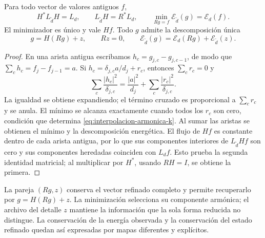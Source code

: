 \begin{theorem}
\label{thm:energia-schur-refinamiento}
Para todo vector de valores antiguos \(f\),
\begin{equation}
 H^*L_{\widetilde d}H=L_d,
 \qquad L_{\widetilde d}H=R^*L_d,
 \qquad
 \min_{Rg=f}\mathcal E_{\widetilde d}(g)=\mathcal E_d(f).
 \label{eq:isometria-energia-k}
\end{equation}
El minimizador es único y vale \(Hf\). Todo \(g\) admite la
descomposición única
\begin{equation}
 g=H(Rg)+z,\qquad Rz=0,
 \qquad
 \mathcal E_{\widetilde d}(g)
 =\mathcal E_d(Rg)+\mathcal E_{\widetilde d}(z).
 \label{eq:detalle-energia-k}
\end{equation}
\end{theorem}
\begin{proof}
En una arista antigua escribamos \(h_c=g_{j,c}-g_{j,c-1}\), de modo
que \(\sum_ch_c=f_j-f_{j-1}=a\). Si
\(h_c=\delta_{j,c}a/d_j+r_c\), entonces \(\sum_cr_c=0\) y
\[
 \sum_c\frac{|h_c|^2}{\delta_{j,c}}
 =\frac{|a|^2}{d_j}+\sum_c\frac{|r_c|^2}{\delta_{j,c}}.
\]
La igualdad se obtiene expandiendo; el término cruzado es proporcional a
\(\sum_cr_c\) y se anula. El mínimo se alcanza exactamente cuando
todos los \(r_c\) son cero, condición que determina
\eqref{eq:interpolacion-armonica-k}. Al sumar las aristas se obtienen
el mínimo y la descomposición energética. El flujo de \(Hf\) es
constante dentro de cada arista antigua, por lo que sus componentes
interiores de \(L_{\widetilde d}Hf\) son cero y sus componentes heredadas
coinciden con \(L_df\). Esto prueba la segunda identidad matricial; al
multiplicar por \(H^*\), usando \(RH=I\), se obtiene la primera.
\end{proof}

La pareja \((Rg,z)\) conserva el vector refinado completo y permite
recuperarlo por \(g=H(Rg)+z\). La minimización selecciona su
componente armónica; el archivo del detalle \(z\) mantiene la
información que la sola forma reducida no distingue. La conservación
de la energía observada y la conservación del estado refinado quedan
así expresadas por mapas diferentes y explícitos.

